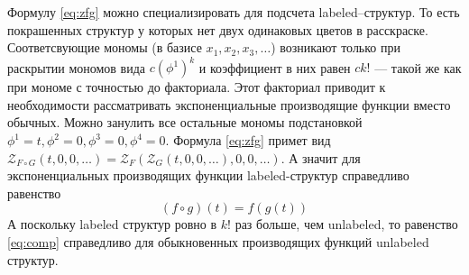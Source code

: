 Формулу \ref{eq:zfg} можно специализировать для подсчета labeled--структур. То
есть покрашенных структур у которых нет двух одинаковых цветов в расскраске.
Соответсвующие мономы (в базисе $x_1, x_2, x_3, \dots$) возникают только при
раскрытии мономов вида $c(\phi^1)^k$ и коэффициент в них равен $ck!$ --- такой
же как при мономе с точностью до факториала. Этот факториал приводит к
необходимости рассматривать экспоненциальные производящие функции вместо
обычных. Можно занулить все остальные мономы подстановкой $\phi^1 = t, \phi^2 =
0, \phi^3 = 0, \phi^4 = 0$. Формула \ref{eq:zfg} примет вид $
\mathcal Z_{F \circ G} (t, 0, 0, \dots) =
	\mathcal Z_F(
		\mathcal Z_G(t, 0, 0, \dots), 0, 0, \dots
	)
$.
А значит для экспоненциальных производящих функции labeled-структур справедливо
равенство
\begin{equation}
\label{eq:comp}
(f \circ g) (t) = f(g(t))
\end{equation}
А поскольку labeled структур ровно в $k!$ раз больше, чем unlabeled, то
равенство \ref{eq:comp} справедливо для обыкновенных производящих функций
unlabeled структур.

